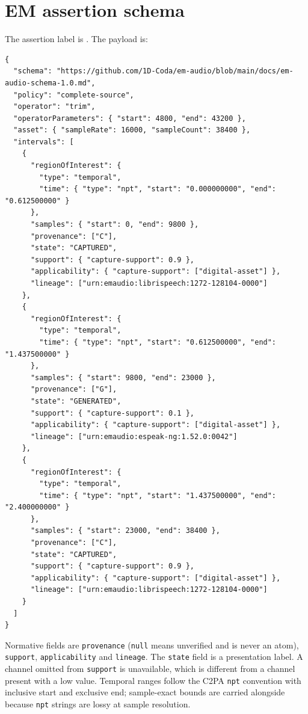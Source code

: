 \documentclass[11pt]{article}
\begin{document}
\section{EM assertion schema}
\label{s:schema}

The assertion label is \texttt{\Clabel{}}. The payload is:

\begingroup\small
\begin{verbatim}
{
  "schema": "https://github.com/1D-Coda/em-audio/blob/main/docs/em-audio-schema-1.0.md",
  "policy": "complete-source",
  "operator": "trim",
  "operatorParameters": { "start": 4800, "end": 43200 },
  "asset": { "sampleRate": 16000, "sampleCount": 38400 },
  "intervals": [
    {
      "regionOfInterest": {
        "type": "temporal",
        "time": { "type": "npt", "start": "0.000000000", "end": "0.612500000" }
      },
      "samples": { "start": 0, "end": 9800 },
      "provenance": ["C"],
      "state": "CAPTURED",
      "support": { "capture-support": 0.9 },
      "applicability": { "capture-support": ["digital-asset"] },
      "lineage": ["urn:emaudio:librispeech:1272-128104-0000"]
    },
    {
      "regionOfInterest": {
        "type": "temporal",
        "time": { "type": "npt", "start": "0.612500000", "end": "1.437500000" }
      },
      "samples": { "start": 9800, "end": 23000 },
      "provenance": ["G"],
      "state": "GENERATED",
      "support": { "capture-support": 0.1 },
      "applicability": { "capture-support": ["digital-asset"] },
      "lineage": ["urn:emaudio:espeak-ng:1.52.0:0042"]
    },
    {
      "regionOfInterest": {
        "type": "temporal",
        "time": { "type": "npt", "start": "1.437500000", "end": "2.400000000" }
      },
      "samples": { "start": 23000, "end": 38400 },
      "provenance": ["C"],
      "state": "CAPTURED",
      "support": { "capture-support": 0.9 },
      "applicability": { "capture-support": ["digital-asset"] },
      "lineage": ["urn:emaudio:librispeech:1272-128104-0000"]
    }
  ]
}
\end{verbatim}
\endgroup

Normative fields are \texttt{provenance} (\texttt{null} means unverified and is
never an atom), \texttt{support}, \texttt{applicability} and \texttt{lineage}.
The \texttt{state} field is a presentation label. A channel omitted from
\texttt{support} is unavailable, which is different from a channel present with
a low value. Temporal ranges follow the C2PA \texttt{npt} convention with
inclusive start and exclusive end; sample-exact bounds are carried alongside
because \texttt{npt} strings are lossy at sample resolution.
\end{document}
